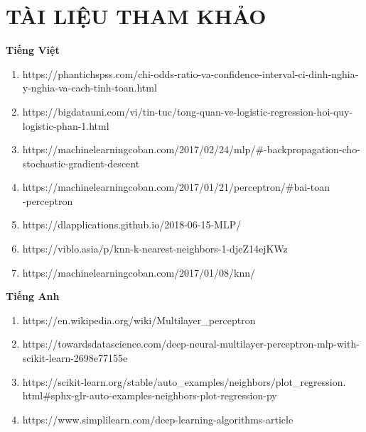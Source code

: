 \documentclass{report}
\begin{document}
\fontsize{18}{10}\selectfont
\chapter{TÀI LIỆU THAM KHẢO}
    \fontsize{16}{10}\selectfont\textbf{Tiếng Việt}\vspace{0.4cm}
        \begin{enumerate}
            \item https://phantichspss.com/chi-odds-ratio-va-confidence-interval-ci-dinh-nghia-y-nghia-va-cach-tinh-toan.html
            \item https://bigdatauni.com/vi/tin-tuc/tong-quan-ve-logistic-regression-hoi-quy-logistic-phan-1.html
            \item https://machinelearningcoban.com/2017/02/24/mlp/\#-backpropagation-cho-stochastic-gradient-descent
            \item https://machinelearningcoban.com/2017/01/21/perceptron/\#bai-toan\\-perceptron
            \item https://dlapplications.github.io/2018-06-15-MLP/
            \item https://viblo.asia/p/knn-k-nearest-neighbors-1-djeZ14ejKWz
            \item https://machinelearningcoban.com/2017/01/08/knn/
        \end{enumerate}
        
    \vspace{0.4cm}\fontsize{16}{10}\selectfont\textbf{Tiếng Anh}\vspace{0.4cm}
        \begin{enumerate}
            \item https://en.wikipedia.org/wiki/Multilayer\_perceptron
            \item https://towardsdatascience.com/deep-neural-multilayer-perceptron-mlp-with-scikit-learn-2698e77155e
            \item https://scikit-learn.org/stable/auto\_examples/neighbors/plot\_regression.\\html\#sphx-glr-auto-examples-neighbors-plot-regression-py
            \item https://www.simplilearn.com/deep-learning-algorithms-article
        \end{enumerate}
\end{document}
